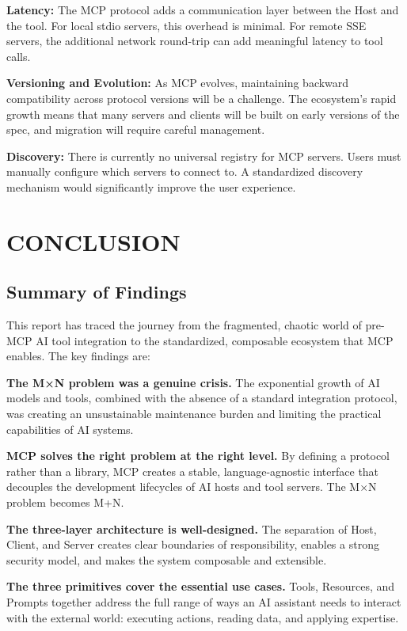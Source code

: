 \textbf{Latency:} The MCP protocol adds a communication layer between the Host and the tool. For local stdio servers, this overhead is minimal. For remote SSE servers, the additional network round-trip can add meaningful latency to tool calls.

\textbf{Versioning and Evolution:} As MCP evolves, maintaining backward compatibility across protocol versions will be a challenge. The ecosystem's rapid growth means that many servers and clients will be built on early versions of the spec, and migration will require careful management.

\textbf{Discovery:} There is currently no universal registry for MCP servers. Users must manually configure which servers to connect to. A standardized discovery mechanism would significantly improve the user experience.

\chapter{CONCLUSION}

\section{Summary of Findings}
This report has traced the journey from the fragmented, chaotic world of pre-MCP AI tool integration to the standardized, composable ecosystem that MCP enables. The key findings are:

\textbf{The M×N problem was a genuine crisis.} The exponential growth of AI models and tools, combined with the absence of a standard integration protocol, was creating an unsustainable maintenance burden and limiting the practical capabilities of AI systems.

\textbf{MCP solves the right problem at the right level.} By defining a protocol rather than a library, MCP creates a stable, language-agnostic interface that decouples the development lifecycles of AI hosts and tool servers. The M×N problem becomes M+N.

\textbf{The three-layer architecture is well-designed.} The separation of Host, Client, and Server creates clear boundaries of responsibility, enables a strong security model, and makes the system composable and extensible.

\textbf{The three primitives cover the essential use cases.} Tools, Resources, and Prompts together address the full range of ways an AI assistant needs to interact with the external world: executing actions, reading data, and applying expertise.


